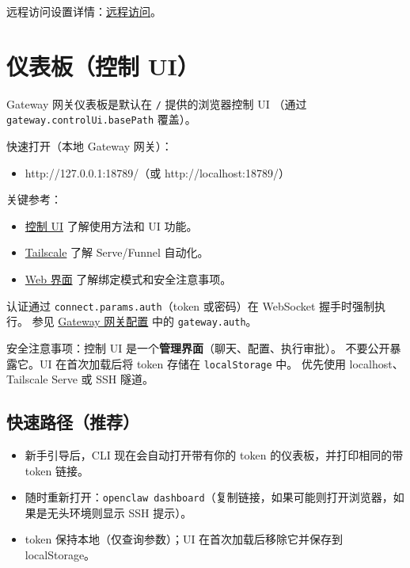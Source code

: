 远程访问设置详情：\href{/gateway/remote}{远程访问}。


\clearpage

\section{仪表板（控制 UI）}


Gateway 网关仪表板是默认在 \texttt{/} 提供的浏览器控制 UI
（通过 \texttt{gateway.controlUi.basePath} 覆盖）。

快速打开（本地 Gateway 网关）：

\begin{itemize}
  \item http://127.0.0.1:18789/（或 http://localhost:18789/）
\end{itemize}


关键参考：

\begin{itemize}
  \item \href{/web/control-ui}{控制 UI} 了解使用方法和 UI 功能。
  \item \href{/gateway/tailscale}{Tailscale} 了解 Serve/Funnel 自动化。
  \item \href{/web}{Web 界面} 了解绑定模式和安全注意事项。
\end{itemize}


认证通过 \texttt{connect.params.auth}（token 或密码）在 WebSocket 握手时强制执行。
参见 \href{/gateway/configuration}{Gateway 网关配置} 中的 \texttt{gateway.auth}。

安全注意事项：控制 UI 是一个\textbf{管理界面}（聊天、配置、执行审批）。
不要公开暴露它。UI 在首次加载后将 token 存储在 \texttt{localStorage} 中。
优先使用 localhost、Tailscale Serve 或 SSH 隧道。

\subsection{快速路径（推荐）}


\begin{itemize}
  \item 新手引导后，CLI 现在会自动打开带有你的 token 的仪表板，并打印相同的带 token 链接。
  \item 随时重新打开：\texttt{openclaw dashboard}（复制链接，如果可能则打开浏览器，如果是无头环境则显示 SSH 提示）。
  \item token 保持本地（仅查询参数）；UI 在首次加载后移除它并保存到 localStorage。
\end{itemize}


